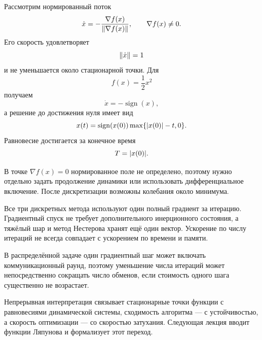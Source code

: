 Рассмотрим нормированный поток
\[
    \dot x
    =
    -
    \frac{
        \nabla f(x)
    }{
        \lVert\nabla f(x)\rVert
    },
    \qquad
    \nabla f(x)\ne0.
\]
Его скорость удовлетворяет
\[
    \lVert\dot x\rVert=1
\]
и не уменьшается около стационарной точки. Для
\[
    f(x)=\frac12x^2
\]
получаем
\[
    \dot x=-\operatorname{sign}(x),
\]
а решение до достижения нуля имеет вид
\[
    x(t)
    =
    \operatorname{sign}(x(0))
    \max\{
        \lvert x(0)\rvert-t,
        0
    \}.
\]
Равновесие достигается за конечное время
\[
    T=\lvert x(0)\rvert.
\]

В точке \(\nabla f(x)=0\) нормированное поле не определено, поэтому
нужно отдельно задать продолжение динамики или использовать
дифференциальное включение. После дискретизации возможны колебания
около минимума.

Все три дискретных метода используют один полный градиент за
итерацию. Градиентный спуск не требует дополнительного инерционного
состояния, а тяжёлый шар и метод Нестерова хранят ещё один вектор.
Ускорение по числу итераций не всегда совпадает с ускорением по
времени и памяти.

В распределённой задаче один градиентный шаг может включать
коммуникационный раунд, поэтому уменьшение числа итераций может
непосредственно сокращать число обменов, если стоимость одного шага
существенно не возрастает.

Непрерывная интерпретация связывает стационарные точки функции с
равновесиями динамической системы, сходимость алгоритма ---
с устойчивостью, а скорость оптимизации --- со скоростью затухания.
Следующая лекция вводит функции Ляпунова и формализует этот переход.
